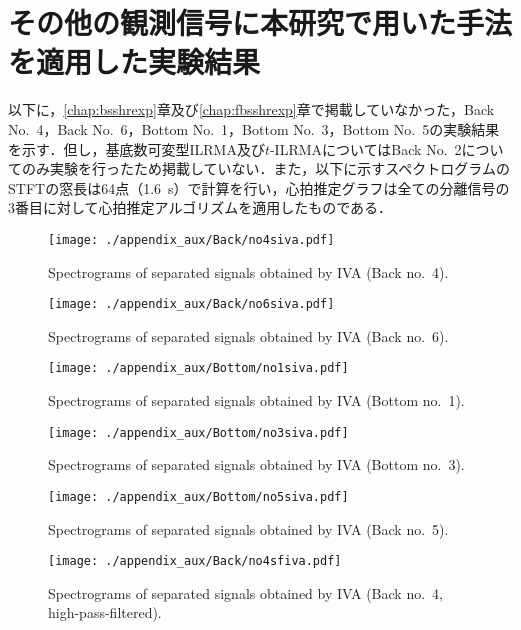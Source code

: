 \chapter{その他の観測信号に本研究で用いた手法を適用した実験結果}
\label{chap:ineq}

以下に，\ref{chap:bsshrexp}章及び\ref{chap:fbsshrexp}章で掲載していなかった，Back No.~4，Back No.~6，Bottom No.~1，Bottom No.~3，Bottom No.~5の実験結果を示す．但し，基底数可変型ILRMA及び$t$-ILRMAについてはBack No.~2についてのみ実験を行ったため掲載していない．また，以下に示すスペクトログラムのSTFTの窓長は64点（1.6~s）で計算を行い，心拍推定グラフは全ての分離信号の3番目に対して心拍推定アルゴリズムを適用したものである．

\begin{figure}[tb]
\centering
\texttt{[image: ./appendix\_aux/Back/no4siva.pdf]}
\caption{Spectrograms of separated signals obtained by IVA (Back no.~4).}
\end{figure}

\begin{figure}[tb]
\centering
\texttt{[image: ./appendix\_aux/Back/no6siva.pdf]}
\caption{Spectrograms of separated signals obtained by IVA (Back no.~6).}
\end{figure}

\begin{figure}[tb]
\centering
\texttt{[image: ./appendix\_aux/Bottom/no1siva.pdf]}
\caption{Spectrograms of separated signals obtained by IVA (Bottom no.~1).}
\end{figure}

\begin{figure}[tb]
\centering
\texttt{[image: ./appendix\_aux/Bottom/no3siva.pdf]}
\caption{Spectrograms of separated signals obtained by IVA (Bottom no.~3).}
\end{figure}

\begin{figure}[tb]
\centering
\texttt{[image: ./appendix\_aux/Bottom/no5siva.pdf]}
\caption{Spectrograms of separated signals obtained by IVA (Back no.~5).}
\end{figure}

\begin{figure}[tb]
\centering
\texttt{[image: ./appendix\_aux/Back/no4sfiva.pdf]}
\caption{Spectrograms of separated signals obtained by IVA (Back no.~4, high-pass-filtered).}
\end{figure}

